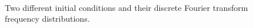 \documentclass[a4paper,12pt]{article}
\begin{document}
  \begin{figure} 
   \centering
     \\
   \caption{Two different initial conditions and their discrete Fourier transform frequency distributions.}
   \label{fig_ic}
  \end{figure}
\end{document}
